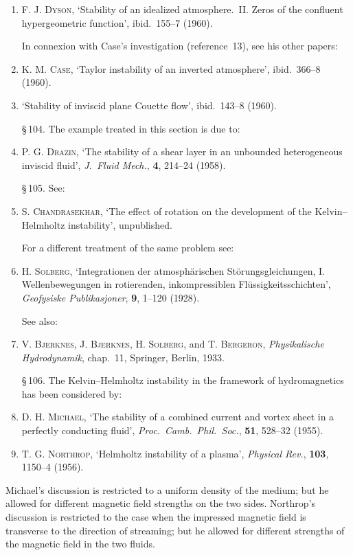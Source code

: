 \begin{enumerate}
\item \textsc{F. J. Dyson}, `Stability of an idealized atmosphere.~II. Zeros of the
  confluent hypergeometric function', ibid.\ 155--7 (1960).

\smallskip\noindent
In connexion with Case's investigation (reference~13), see his other papers:

\item \textsc{K. M. Case}, `Taylor instability of an inverted atmosphere', ibid.\ 366--8
  (1960).

\item \makebox[2em][l]{------} `Stability of inviscid plane Couette flow', ibid.\ 143--8 (1960).

\medskip
\noindent\S\,104. The example treated in this section is due to:

\item \textsc{P. G. Drazin}, `The stability of a shear layer in an unbounded heterogeneous
  inviscid fluid', \emph{J.\ Fluid Mech.}, \textbf{4}, 214--24 (1958).

\medskip
\noindent\S\,105. See:

\item \textsc{S. Chandrasekhar}, `The effect of rotation on the development of the
  Kelvin--Helmholtz instability', unpublished.

\smallskip\noindent
For a different treatment of the same problem see:

\item \textsc{H. Solberg}, `Integrationen der atmosph\"arischen St\"orungsgleichungen, I.
  Wellenbewegungen in rotierenden, inkompressiblen Fl\"ussigkeitsschichten',
  \emph{Geofysiske Publikasjoner}, \textbf{9}, 1--120 (1928).

\smallskip\noindent
See also:

\item \textsc{V. Bjerknes}, \textsc{J. Bjerknes}, \textsc{H. Solberg},
  and \textsc{T. Bergeron}, \emph{Physikalische Hydrodynamik},
  chap.~11, Springer, Berlin, 1933.

\medskip
\noindent\S\,106. The Kelvin--Helmholtz instability in the framework of
hydromagnetics has been considered by:

\item \textsc{D. H. Michael}, `The stability of a combined current and vortex sheet in
  a perfectly conducting fluid',
  \emph{Proc.\ Camb.\ Phil.\ Soc.}, \textbf{51}, 528--32 (1955).

\item \textsc{T. G. Northrop}, `Helmholtz instability of a plasma',
  \emph{Physical Rev.}, \textbf{103}, 1150--4 (1956).

\end{enumerate}

\smallskip\noindent
Michael's discussion is restricted to a uniform density of the medium; but he
allowed for different magnetic field strengths on the two sides. Northrop's
discussion is restricted to the case when the impressed magnetic field is
transverse to the direction of streaming; but he allowed for different
strengths of the magnetic field in the two fluids.
